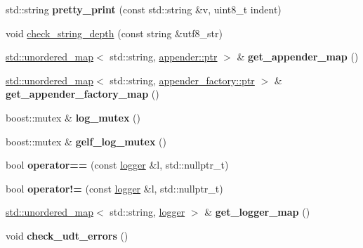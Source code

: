 \begin{DoxyCompactItemize}
std\+::string {\bfseries pretty\+\_\+print} (const std\+::string \&v, uint8\+\_\+t indent)
\item 
void \mbox{\hyperlink{namespacefc_a7c4e6142a78452fe481b4c963117f513}{check\+\_\+string\+\_\+depth}} (const string \&utf8\+\_\+str)
\item 
\mbox{\label{namespacefc_aa05a6784c2988b4dde7ec3c427c5cc5f}} 
\mbox{\hyperlink{classstd_1_1unordered__map}{std\+::unordered\+\_\+map}}$<$ std\+::string, \mbox{\hyperlink{classfc_1_1shared__ptr}{appender\+::ptr}} $>$ \& {\bfseries get\+\_\+appender\+\_\+map} ()
\item 
\mbox{\label{namespacefc_a4cbbf3ab0cf9864b2902810d4c58040f}} 
\mbox{\hyperlink{classstd_1_1unordered__map}{std\+::unordered\+\_\+map}}$<$ std\+::string, \mbox{\hyperlink{classfc_1_1shared__ptr}{appender\+\_\+factory\+::ptr}} $>$ \& {\bfseries get\+\_\+appender\+\_\+factory\+\_\+map} ()
\item 
\mbox{\label{namespacefc_a2c0da4383a0a0a67f11146990207dd07}} 
boost\+::mutex \& {\bfseries log\+\_\+mutex} ()
\item 
\mbox{\label{namespacefc_a572f779421fecb5753a990a6bee4a9c4}} 
boost\+::mutex \& {\bfseries gelf\+\_\+log\+\_\+mutex} ()
\item 
\mbox{\label{namespacefc_ad7d80e6da16f59860ade9ac6dba434f7}} 
bool {\bfseries operator==} (const \mbox{\hyperlink{classfc_1_1logger}{logger}} \&l, std\+::nullptr\+\_\+t)
\item 
\mbox{\label{namespacefc_a48b0394b1a1460c9725e5a0279c6caeb}} 
bool {\bfseries operator!=} (const \mbox{\hyperlink{classfc_1_1logger}{logger}} \&l, std\+::nullptr\+\_\+t)
\item 
\mbox{\label{namespacefc_ad421793956ee8d0fdd40b0f2167ca8a5}} 
\mbox{\hyperlink{classstd_1_1unordered__map}{std\+::unordered\+\_\+map}}$<$ std\+::string, \mbox{\hyperlink{classfc_1_1logger}{logger}} $>$ \& {\bfseries get\+\_\+logger\+\_\+map} ()
\item 
\mbox{\label{namespacefc_afdbe484e2037e7100368d2e2f799af18}} 
void {\bfseries check\+\_\+udt\+\_\+errors} ()
\item 

\end{DoxyCompactItemize}
